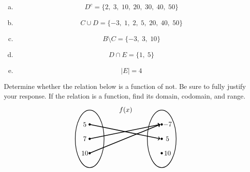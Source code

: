 \documentclass[12pt,letterpaper]{exam}
\begin{document}
\begin{questions}
\sol 
\begin{enumerate}[(a)]
\item 
	\[
	D^c=  \{ 2,\; 3,\; 10,\; 20,\; 30,\; 40,\; 50 \}
	\] \pspace

\item 
	\[
	C \cup D= \{ -3,\; 1,\; 2,\; 5,\; 20,\; 40,\; 50 \} 
	\] \pspace

\item 
	\[
	B \setminus C= \{ -3,\; 3,\; 10 \} 
	\] \pspace

\item 
	\[
	D \cap E= \{ 1,\; 5 \} 
	\] \pspace

\item 
	\[
	|E|= 4
	\]
\end{enumerate}



\newpage
\question[10] Determine whether the relation below is a function of not. Be sure to fully justify your response. If the relation is a function, find its domain, codomain, and range. 
	\[
	\begin{tikzpicture}[scale=0.75]
	\node at (2.5,2) {$f(x)$};
	\draw[line width=0.03cm] (0,0) circle (1 and 2);
	\draw[line width=0.03cm] (5,0) circle (1 and 2);
	
	\draw[fill=black] (0,1) circle (0.07);
	\draw[fill=black] (0,0) circle (0.07);
	\draw[fill=black] (0,-1) circle (0.07);
	
	\draw[fill=black] (5,1) circle (0.07);
	\draw[fill=black] (5,0) circle (0.07);
	\draw[fill=black] (5,-1) circle (0.07);
	
	\draw[line width=0.04cm,->] (0,1) -- (4.9,0);
	\draw[line width=0.04cm,->] (0,0) -- (4.9,1);
	\draw[line width=0.04cm,->] (0,-1) -- (4.9,1);
	
	\node at (-0.3,1) {$5\,$};
	\node at (-0.3,0) {$7\,$};
	\node at (-0.3,-1) {$10\,$};
	
	\node at (5.4,1) {$-7$};
	\node at (5.4,0) {$5$};
	\node at (5.4,-1) {$10$};
	\end{tikzpicture}
	\] \pspace

 \pspace


\end{questions}
\end{document}
